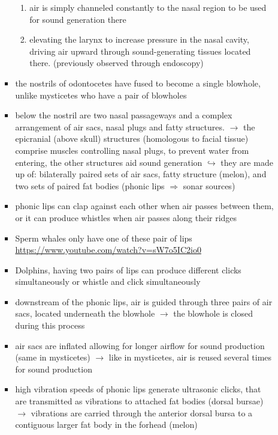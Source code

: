 \documentclass[12pt,a4paper]{article}
\begin{document}
\begin{itemize}
\begin{itemize}
\begin{itemize}
\begin{enumerate}
         \item air is simply channeled constantly to the nasal region to be used for sound generation there
         \item elevating the larynx to increase pressure in the nasal cavity, driving air upward through sound-generating tissues located there. (previously observed through endoscopy)
       \end{enumerate}
       \item the nostrils of odontocetes have fused to become a single blowhole, unlike mysticetes who have a pair of blowholes
       \item below the nostril are two nasal passageways and a complex arrangement of air sacs, nasal plugs and fatty structures. 
       \newline \indent $\longrightarrow$ the epicranial (above skull) structures (homologous to facial tissue) comprise muscles controlling nasal plugs, to prevent water from entering, the other structures aid sound generation
       \newline \indent $\hookrightarrow$ they are made up of: bilaterally paired sets of air sacs, fatty structure (melon), and two sets of paired fat bodies (phonic lips $\Longrightarrow$ sonar sources)
       \item phonic lips can clap against each other when air passes between them, or it can produce whistles when air passes along their ridges
       \item Sperm whales only have one of these pair of lips \url{https://www.youtube.com/watch?v=sW7o5IC2io0}
       \item Dolphins, having two pairs of lips can produce different clicks simultaneously or whistle and click simultaneously
       \item downstream of the phonic lips, air is guided through three pairs of air sacs, located underneath the blowhole
       \newline \indent $\longrightarrow$ the blowhole is closed during this process
       \item air sacs are inflated allowing for longer airflow for sound production (same in mysticetes)
       \newline \indent $\longrightarrow$ like in mysticetes, air is reused several times for sound production
       \item high vibration speeds of phonic lips generate ultrasonic clicks, that are transmitted as vibrations to attached fat bodies (dorsal bursae)
       \newline \indent $\longrightarrow$ vibrations are carried through the anterior dorsal bursa to a contiguous larger fat body in the forhead (melon)

\end{itemize}
\end{itemize}
\end{itemize}
\end{document}
